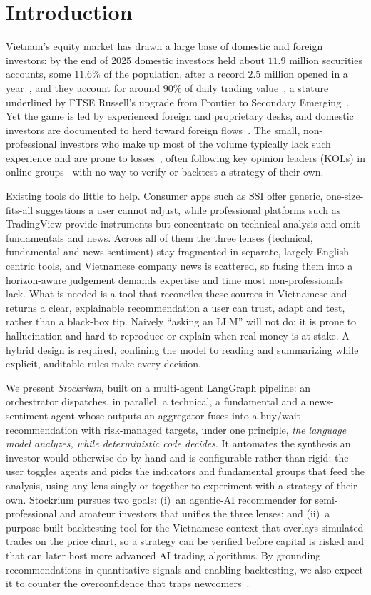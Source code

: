 \documentclass[runningheads]{llncs}
\begin{document}
\section{Introduction}
\label{sec:introduction}

Vietnam's equity market has drawn a large base of domestic and foreign investors:
by the end of 2025 domestic investors held about $11.9$ million securities
accounts, some $11.6\%$ of the population, after a record $2.5$ million opened in a
year~\cite{vsd2025}, and they account for around $90\%$ of daily trading
value~\cite{vinacapital2024}, a stature underlined by FTSE Russell's upgrade from
Frontier to Secondary Emerging~\cite{ftse2025}. Yet the game is led by experienced
foreign and proprietary desks, and domestic investors are documented to herd
toward foreign flows~\cite{vnherd2022}. The small, non-professional investors who
make up most of the volume typically lack such experience and are prone to
losses~\cite{barber2013}, often following key opinion leaders (KOLs) in online
groups~\cite{vnfomo} with no way to verify or backtest a strategy of their own.

Existing tools do little to help. Consumer apps such as SSI offer generic,
one-size-fits-all suggestions a user cannot adjust, while professional platforms
such as TradingView provide instruments but concentrate on technical analysis and
omit fundamentals and news. Across all of them the three lenses (technical,
fundamental and news sentiment) stay fragmented in separate, largely
English-centric tools, and Vietnamese company news is scattered, so fusing them
into a horizon-aware judgement demands expertise and time most non-professionals
lack. What is needed is a tool that reconciles these sources in Vietnamese and
returns a clear, explainable recommendation a user can trust, adapt and test,
rather than a black-box tip. Naively ``asking an LLM'' will not do: it is prone to
hallucination and hard to reproduce or explain when real money is at stake. A
hybrid design is required, confining the model to reading and summarizing while
explicit, auditable rules make every decision.

We present \emph{Stockrium}, built on a multi-agent LangGraph pipeline: an
orchestrator dispatches, in parallel, a technical, a fundamental and a
news-sentiment agent whose outputs an aggregator fuses into a buy/wait
recommendation with risk-managed targets, under one principle, \emph{the language
model analyzes, while deterministic code decides}. It automates the synthesis an
investor would otherwise do by hand and is configurable rather than rigid: the
user toggles agents and picks the indicators and fundamental groups that feed the
analysis, using any lens singly or together to experiment with a strategy of their
own. Stockrium pursues two goals: (i)~an agentic-AI recommender for
semi-professional and amateur investors that unifies the three lenses; and (ii)~a
purpose-built backtesting tool for the Vietnamese context that overlays simulated
trades on the price chart, so a strategy can be verified before capital is risked
and that can later host more advanced AI trading algorithms. By grounding
recommendations in quantitative signals and enabling backtesting, we also expect
it to counter the overconfidence that traps newcomers~\cite{barber2013}.
\end{document}
